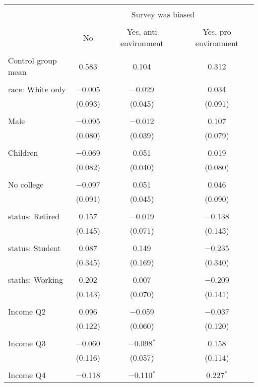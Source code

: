 
\begin{tabular}{@{\extracolsep{5pt}}lccc} 
\\[-1.8ex]\hline 
\hline \\[-1.8ex] 
 & \multicolumn{3}{c}{Survey was biased} \\ 
\cline{2-4} 
\\[-1.8ex] & No & Yes, anti environment & Yes, pro environment \\ 
\hline \\[-1.8ex] 
 Control group mean & 0.583 & 0.104 & 0.312  \\ \hline \\[-1.8ex] race: White only & $-$0.005 & $-$0.029 & 0.034 \\ 
  & (0.093) & (0.045) & (0.091) \\ 
  & & & \\ 
 Male & $-$0.095 & $-$0.012 & 0.107 \\ 
  & (0.080) & (0.039) & (0.079) \\ 
  & & & \\ 
 Children & $-$0.069 & 0.051 & 0.019 \\ 
  & (0.082) & (0.040) & (0.080) \\ 
  & & & \\ 
 No college & $-$0.097 & 0.051 & 0.046 \\ 
  & (0.091) & (0.045) & (0.090) \\ 
  & & & \\ 
 status: Retired & 0.157 & $-$0.019 & $-$0.138 \\ 
  & (0.145) & (0.071) & (0.143) \\ 
  & & & \\ 
 status: Student & 0.087 & 0.149 & $-$0.235 \\ 
  & (0.345) & (0.169) & (0.340) \\ 
  & & & \\ 
 staths: Working & 0.202 & 0.007 & $-$0.209 \\ 
  & (0.143) & (0.070) & (0.141) \\ 
  & & & \\ 
 Income Q2 & 0.096 & $-$0.059 & $-$0.037 \\ 
  & (0.122) & (0.060) & (0.120) \\ 
  & & & \\ 
 Income Q3 & $-$0.060 & $-$0.098$^{*}$ & 0.158 \\ 
  & (0.116) & (0.057) & (0.114) \\ 
  & & & \\ 
 Income Q4 & $-$0.118 & $-$0.110$^{*}$ & 0.227$^{*}$ \\ 

\end{tabular}
